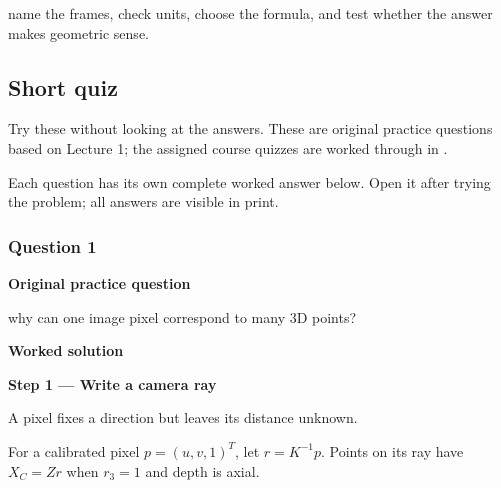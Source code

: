 \documentclass[letterpaper,11pt,english,openany,oneside]{jupyterBook}
\begin{document}
\sphinxAtStartPar
{} name the frames, check units, choose the formula, and test whether the answer makes geometric sense.


\subsection{Short quiz}
\label{\detokenize{lectures/lecture01/tldr:short-quiz}}
\sphinxAtStartPar
Try these without looking at the answers. These are original practice questions based on Lecture 1; the assigned course quizzes are worked through in {\hyperref[\detokenize{lectures/lecture01/frames-quizzes:lec01-frames}]{}}.

\sphinxAtStartPar
Each question has its own complete worked answer below. Open it after trying the problem; all answers are visible in print.


\subsubsection{Question 1}
\label{\detokenize{lectures/lecture01/tldr:question-1}}\label{\detokenize{lectures/lecture01/tldr:lec01-tldr-q1}}
\par\medskip\textbf{Original practice question}\par\smallskip

\sphinxAtStartPar
{} why can one image pixel correspond to many 3D points?

\par\medskip

\par\medskip
\textbf{Worked solution}\par\smallskip

\par\medskip{}
{\color{QuizStepRed}\bfseries Step 1 — Write a camera ray}\par\smallskip

\sphinxAtStartPar
{} A pixel fixes a direction but leaves its distance unknown.

\sphinxAtStartPar
For a calibrated pixel {\color{QuizMathBlue} \(p=(u,v,1)^T\)}, let {\color{QuizMathBlue} \(r=K^{-1}p\)}. Points on its ray have {\color{QuizMathBlue} \(X_C=Zr\)} when {\color{QuizMathBlue} \(r_3=1\)} and depth is axial.

\par
\end{document}
